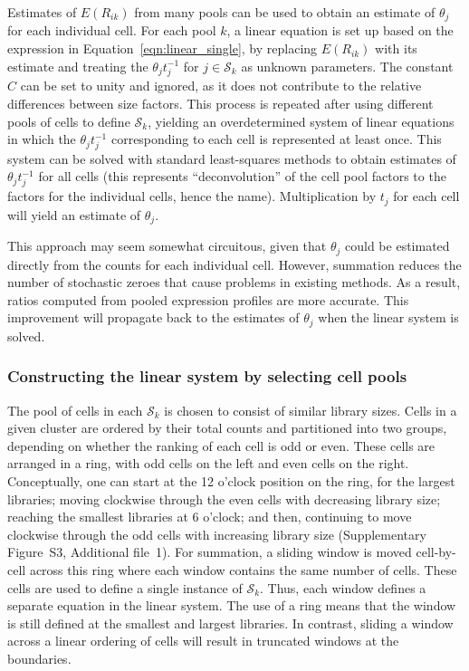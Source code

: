 \documentclass{bmcart}
\newcommand{\suppring}{S3}
\newcommand{\revised}[1]{#1}
\begin{document}
\revised{Estimates of $E(R_{ik})$ from many pools} can be used to obtain \revised{an estimate of} $\theta_j$ for each individual cell.
\revised{For each pool $k$, a} linear equation is set up based on the expression in Equation~\ref{eqn:linear_single}, 
by replacing \revised{$E(R_{ik})$} with its estimate and treating the $\theta_j t_j^{-1}$ \revised{for $j \in \mathcal{S}_k$} as unknown parameters.
The constant $C$ can be set to unity and ignored, as it does not contribute to the relative differences between size factors.
\revised{This process is repeated after using different pools of cells to define} $\mathcal{S}_{k}$, \revised{yielding an} overdetermined system of linear equations in which the $\theta_j t_j^{-1}$ \revised{corresponding to} each \revised{cell} is represented at least once.
This system can be solved with standard least-squares methods to obtain estimates of $\theta_j t_j^{-1}$ for all cells 
    (this represents ``deconvolution'' of the cell pool factors to the factors for the individual cells, hence the name).
Multiplication by $t_j$ for each cell will yield an estimate of $\theta_j$.

This approach may seem somewhat circuitous, given that $\theta_j$ could be estimated directly from the counts for each individual cell.
However, summation reduces the number of stochastic zeroes that cause problems in existing methods.
As a result, ratios computed from pooled expression profiles are more accurate.
This improvement will propagate back to the estimates of $\theta_j$ when the linear system is solved.

\subsubsection*{Constructing the linear system by selecting cell pools}
The pool of cells in each $\mathcal{S}_{k}$ is chosen to consist of similar library sizes.
Cells in a given cluster are ordered by their total counts and partitioned into two groups, depending on whether the ranking of each cell is odd or even.
These cells are arranged in a ring, with odd cells on the left and even cells on the right.
Conceptually, one can start at the 12 o'clock position on the ring, for the largest libraries; moving clockwise through the even cells with decreasing library size;
reaching the smallest libraries at 6 o'clock; and then, continuing to move clockwise through the odd cells with increasing library size (Supplementary Figure~\suppring{}, Additional file~1).
For summation, a sliding window is moved cell-by-cell across this ring where each window contains the same number of cells.
These cells are used to define a single instance of $\mathcal{S}_{k}$.
Thus, each window defines a separate equation in the linear system.
The use of a ring means that the window is still defined at the smallest and largest libraries.
In contrast, sliding a window across a linear ordering of cells will result in truncated windows at the boundaries.
\end{document}
